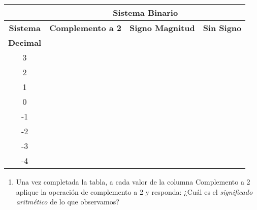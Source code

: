 \documentclass[12pt]{article}
\begin{document}
\begin{enumerate}
\begin{center}
\begin{tabular}[t]{|c|c|c|c|}
            \cline{2-4}

            \multicolumn{1}{c}{}&\multicolumn{3}{|c|}{\textbf{Sistema Binario}}\\

            \hline

                \textbf{Sistema} & \textbf{Complemento a 2}& \textbf{Signo
                Magnitud} & \textbf{Sin Signo}\\

                \textbf{Decimal} & ~ & ~ &\\

            \hline

                3 & \hspace{9em}~&\hspace{9em}~&\hspace{9em}~\\

            \hline

                2&&&\\

            \hline

                1&&&\\

            \hline

                0&&&\\

            \hline

                -1&&&\\

            \hline

                -2&&&\\

            \hline

                -3&&&\\

            \hline

                -4&&&\\

            \hline

            \end{tabular}

        \end{center}

        \begin{enumerate}

            \item Una vez completada la tabla, a cada valor de la columna
                Complemento a 2 aplique la operación de complemento a 2 y
                responda: ¿Cuál es el \emph{significado aritmético} de lo que
                observamos?


\end{enumerate}
\end{enumerate}
\end{document}
